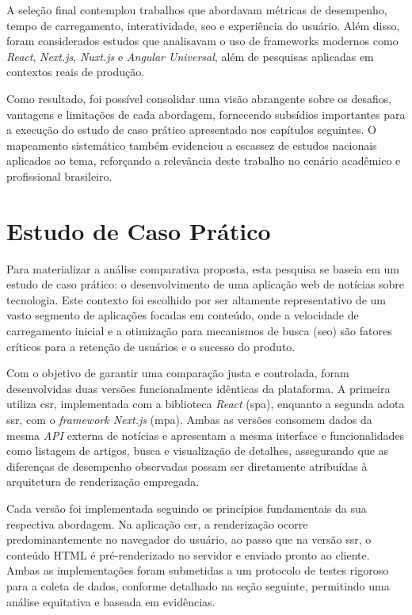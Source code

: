 A seleção final contemplou trabalhos que abordavam métricas de desempenho, tempo de carregamento, interatividade, \acrshort{seo} e experiência do usuário. Além disso, foram considerados estudos que analisavam o uso de frameworks modernos como \textit{React}, \textit{Next.js}, \textit{Nuxt.js} e \textit{Angular Universal}, além de pesquisas aplicadas em contextos reais de produção.

Como resultado, foi possível consolidar uma visão abrangente sobre os desafios, vantagens e limitações de cada abordagem, fornecendo subsídios importantes para a execução do estudo de caso prático apresentado nos capítulos seguintes. O mapeamento sistemático também evidenciou a escassez de estudos nacionais aplicados ao tema, reforçando a relevância deste trabalho no cenário acadêmico e profissional brasileiro.


\section{Estudo de Caso Prático}
\label{sec:estudo-de-caso-pratico}

Para materializar a análise comparativa proposta, esta pesquisa se baseia em um estudo de caso prático: o desenvolvimento de uma aplicação web de notícias sobre tecnologia. Este contexto foi escolhido por ser altamente representativo de um vasto segmento de aplicações focadas em conteúdo, onde a velocidade de carregamento inicial e a otimização para mecanismos de busca (\acrshort{seo}) são fatores críticos para a retenção de usuários e o sucesso do produto.

Com o objetivo de garantir uma comparação justa e controlada, foram desenvolvidas duas versões funcionalmente idênticas da plataforma. A primeira utiliza \acrfull{csr}, implementada com a biblioteca \textit{React} (\acrshort{spa}), enquanto a segunda adota \acrfull{ssr}, com o \textit{framework Next.js} (\acrshort{mpa}). Ambas as versões consomem dados da mesma \textit{API} externa de notícias e apresentam a mesma interface e funcionalidades como listagem de artigos, busca e visualização de detalhes, assegurando que as diferenças de desempenho observadas possam ser diretamente atribuídas à arquitetura de renderização empregada.

Cada versão foi implementada seguindo os princípios fundamentais da sua respectiva abordagem. Na aplicação \acrshort{csr}, a renderização ocorre predominantemente no navegador do usuário, ao passo que na versão \acrshort{ssr}, o conteúdo HTML é pré-renderizado no servidor e enviado pronto ao cliente. Ambas as implementações foram submetidas a um protocolo de testes rigoroso para a coleta de dados, conforme detalhado na seção seguinte, permitindo uma análise equitativa e baseada em evidências.


